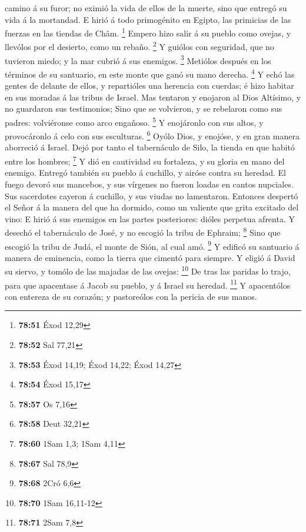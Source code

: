 camino á su furor; no eximió la vida de ellos de la muerte, sino que
entregó su vida á la mortandad.  E hirió á todo primogénito
en Egipto, las primicias de las fuerzas en las tiendas de Châm.
\footnote{\textbf{78:51} Éxod 12,29}  Empero hizo salir á
su pueblo como ovejas, y llevólos por el desierto, como un rebaño.
\footnote{\textbf{78:52} Sal 77,21}  Y guiólos con
seguridad, que no tuvieron miedo; y la mar cubrió á sus enemigos.
\footnote{\textbf{78:53} Éxod 14,19; Éxod 14,22; Éxod 14,27}
 Metiólos después en los términos de su santuario, en este
monte que ganó su mano derecha. \footnote{\textbf{78:54} Éxod 15,17}
 Y echó las gentes de delante de ellos, y repartióles una
herencia con cuerdas; é hizo habitar en sus moradas á las tribus de
Israel.  Mas tentaron y enojaron al Dios Altísimo, y no
guardaron sus testimonios;  Sino que se volvieron, y se
rebelaron como sus padres: volviéronse como arco engañoso. \footnote{\textbf{78:57}
  Os 7,16}  Y enojáronlo con sus altos, y provocáronlo á
celo con sus esculturas. \footnote{\textbf{78:58} Deut 32,21}
 Oyólo Dios, y enojóse, y en gran manera aborreció á
Israel.  Dejó por tanto el tabernáculo de Silo, la tienda
en que habitó entre los hombres; \footnote{\textbf{78:60} 1Sam 1,3; 1Sam
  4,11}  Y dió en cautividad su fortaleza, y su gloria en
mano del enemigo.  Entregó también su pueblo á cuchillo, y
airóse contra su heredad.  El fuego devoró sus mancebos, y
sus vírgenes no fueron loadas en cantos nupciales.  Sus
sacerdotes cayeron á cuchillo, y sus viudas no lamentaron. 
Entonces despertó el Señor á la manera del que ha dormido, como un
valiente que grita excitado del vino:  E hirió á sus
enemigos en las partes posteriores: dióles perpetua afrenta.
 Y desechó el tabernáculo de José, y no escogió la tribu de
Ephraim; \footnote{\textbf{78:67} Sal 78,9}  Sino que
escogió la tribu de Judá, el monte de Sión, al cual amó. \footnote{\textbf{78:68}
  2Cró 6,6}  Y edificó su santuario á manera de eminencia,
como la tierra que cimentó para siempre.  Y eligió á David
su siervo, y tomólo de las majadas de las ovejas: \footnote{\textbf{78:70}
  1Sam 16,11-12}  De tras las paridas lo trajo, para que
apacentase á Jacob su pueblo, y á Israel su heredad. \footnote{\textbf{78:71}
  2Sam 7,8}  Y apacentólos con entereza de su corazón; y
pastoreólos con la pericia de sus manos.

